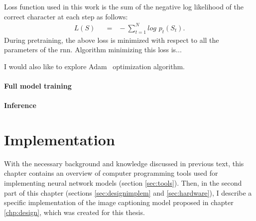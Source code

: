 Loss function used in this work is the sum of the negative log likelihood of the correct character at each step as follows:
\begin{align}
L(S) \hspace{7pt}&=\hspace{7pt} -\sum\limits_{t=1}^N log\hspace{4pt}p_t(S_t).  \label{eq:loss1}
\end{align}
During pretraining, the above loss is minimized with respect to all the parameters of the \gls{rnn}. Algorithm minimizing this loss is...


I would also like to explore Adam~\cite{DBLP:journals/corr/KingmaB14} optimization algorithm.

\subsubsection{Full model training}

\subsubsection{Inference}


\chapter{Implementation}\label{chp:implementation}

With the necessary background and knowledge discussed in previous text, this chapter contains an overview of computer programming tools used for implementing neural network models (section \ref{sec:tools}). Then, in the second part of this chapter (sections \ref{sec:designimplem} and \ref{sec:hardware}), I describe a specific implementation of the image captioning model proposed in chapter \ref{chp:design}, which was created for this thesis.

